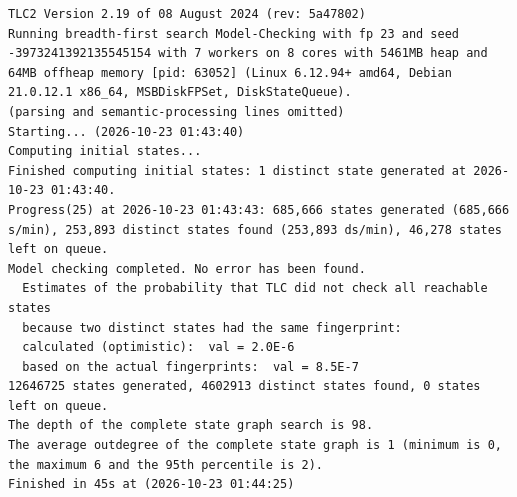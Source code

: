 \documentclass[11pt,a4paper]{article}
\begin{document}
\begin{lstlisting}[float, caption={SaeProvision\_races.cfg result}, captionpos=t, label={lst:tlc-saeprovision-races}]
TLC2 Version 2.19 of 08 August 2024 (rev: 5a47802)
Running breadth-first search Model-Checking with fp 23 and seed -3973241392135545154 with 7 workers on 8 cores with 5461MB heap and 64MB offheap memory [pid: 63052] (Linux 6.12.94+ amd64, Debian 21.0.12.1 x86_64, MSBDiskFPSet, DiskStateQueue).
(parsing and semantic-processing lines omitted)
Starting... (2026-10-23 01:43:40)
Computing initial states...
Finished computing initial states: 1 distinct state generated at 2026-10-23 01:43:40.
Progress(25) at 2026-10-23 01:43:43: 685,666 states generated (685,666 s/min), 253,893 distinct states found (253,893 ds/min), 46,278 states left on queue.
Model checking completed. No error has been found.
  Estimates of the probability that TLC did not check all reachable states
  because two distinct states had the same fingerprint:
  calculated (optimistic):  val = 2.0E-6
  based on the actual fingerprints:  val = 8.5E-7
12646725 states generated, 4602913 distinct states found, 0 states left on queue.
The depth of the complete state graph search is 98.
The average outdegree of the complete state graph is 1 (minimum is 0, the maximum 6 and the 95th percentile is 2).
Finished in 45s at (2026-10-23 01:44:25)
\end{lstlisting}
\bigskip
\end{document}
